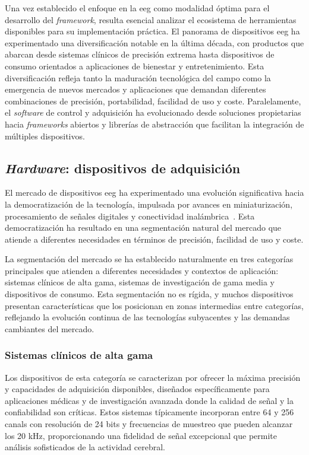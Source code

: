 Una vez establecido el enfoque en la \acrshort{eeg} como modalidad óptima para el desarrollo del \textit{\gls{framework}}, resulta esencial analizar el ecosistema de herramientas disponibles para su implementación práctica. El panorama de dispositivos \acrshort{eeg} ha experimentado una diversificación notable en la última década, con productos que abarcan desde sistemas clínicos de precisión extrema hasta dispositivos de consumo orientados a aplicaciones de bienestar y entretenimiento. Esta diversificación refleja tanto la maduración tecnológica del campo como la emergencia de nuevos mercados y aplicaciones que demandan diferentes combinaciones de precisión, portabilidad, facilidad de uso y coste. Paralelamente, el \textit{software} de control y adquisición ha evolucionado desde soluciones propietarias hacia \textit{\glspl{framework}} abiertos y librerías de abstracción que facilitan la integración de múltiples dispositivos.

\subsection{\textit{Hardware}: dispositivos de adquisición}
\label{subsec:hardware_dispositivos}

El mercado de dispositivos \acrshort{eeg} ha experimentado una evolución significativa hacia la democratización de la tecnología, impulsada por avances en miniaturización, procesamiento de señales digitales y conectividad inalámbrica~\cite{sellers2006noninvasive,chavarriaga2017heading}. Esta democratización ha resultado en una segmentación natural del mercado que atiende a diferentes necesidades en términos de precisión, facilidad de uso y coste.

La segmentación del mercado se ha establecido naturalmente en tres categorías principales que atienden a diferentes necesidades y contextos de aplicación: sistemas clínicos de alta gama, sistemas de investigación de gama media y dispositivos de consumo. Esta segmentación no es rígida, y muchos dispositivos presentan características que los posicionan en zonas intermedias entre categorías, reflejando la evolución continua de las tecnologías subyacentes y las demandas cambiantes del mercado.

\subsubsection{Sistemas clínicos de alta gama}
\label{subsubsec:sistemas_clinicos}

Los dispositivos de esta categoría se caracterizan por ofrecer la máxima precisión y capacidades de adquisición disponibles, diseñados específicamente para aplicaciones médicas y de investigación avanzada donde la calidad de señal y la confiabilidad son críticas. Estos sistemas típicamente incorporan entre 64 y 256 \glspl{canal} con resolución de 24 bits y frecuencias de muestreo que pueden alcanzar los 20 kHz, proporcionando una fidelidad de señal excepcional que permite análisis sofisticados de la actividad cerebral.

